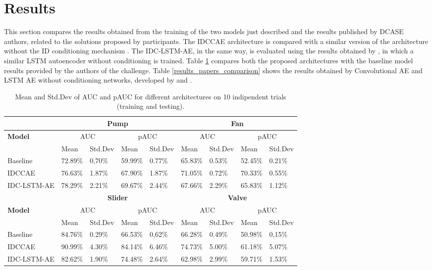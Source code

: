 \section{Results}
This section compares the results obtained from the training of the two models just described and the results published by DCASE authors, related to the solutions proposed by participants. The IDCCAE architecture is compared with a similar version of the architecture without the ID conditioning mechanism \cite{15DeepDenseConvAE}. The IDC-LSTM-AE, in the same way, is evaluated using the results obtained by \cite{16LSTMDeepAutoencodersForASDtask}, in which a similar LSTM autoencoder without conditioning is trained. 
Table \ref{results} compares both the proposed architectures with the baseline model results provided by the authors of the challenge.
Table \ref{results_papers_comparison} shows the results obtained by Convolutional AE and LSTM AE without conditioning networks, developed by \cite{15DeepDenseConvAE} and \cite{16LSTMDeepAutoencodersForASDtask}.

\begin{table}[ht]
\small
\centering
\begin{tabular}{|m{2.8cm}|m{1.2cm}|m{1.3cm}|m{1.2cm}|m{1.3cm}|m{1.2cm}|m{1.3cm}|m{1.2cm}|m{1.3cm}|} 
\cline{2-9}
\multicolumn{1}{c|}{} & \multicolumn{4}{c|}{\textbf{Pump}} & \multicolumn{4}{c|}{\textbf{Fan}} \\ 
\hline
\multirow{2}{*}{\textbf{Model}} & \multicolumn{2}{c|}{AUC} & \multicolumn{2}{c|}{pAUC} & \multicolumn{2}{c|}{AUC} & \multicolumn{2}{c|}{pAUC} \\ 
\cline{2-9}
 & Mean & Std.Dev & Mean & Std.Dev & Mean & Std.Dev & Mean & Std.Dev \\ 
\hline
Baseline & 72.89\% & 0,70\%~ & 59.99\% & 0.77\% & 65.83\% & 0.53\% & 52.45\% & 0.21\% \\ 
\hline
IDCCAE & 76.63\% & 1.87\% & 67.90\% & 1.87\% & 71.05\% & 0.72\% & 70.33\% & 0.55\% \\ 
\hline
IDC-LSTM-AE & 78.29\% & 2.21\% & 69.67\% & 2.44\% & 67.66\% & 2.29\% & 65.83\% & 1.12\% \\ 
\hline
\multicolumn{1}{c|}{} & \multicolumn{4}{c|}{\textbf{Slider}} & \multicolumn{4}{c|}{\textbf{Valve}} \\ 
\hline
\multirow{2}{*}{\textbf{Model}} & \multicolumn{2}{c|}{AUC} & \multicolumn{2}{c|}{pAUC} & \multicolumn{2}{c|}{AUC} & \multicolumn{2}{c|}{pAUC} \\ 
\cline{2-9}
 & Mean & Std.Dev & Mean & Std.Dev & Mean & Std.Dev & Mean & Std.Dev \\ 
\hline
Baseline & 84.76\% & 0.29\% & 66.53\% & 0,62\%~ & 66.28\% & 0.49\% & 50.98\% & 0,15\%~ \\ 
\hline
IDCCAE & 90.99\% & 4.30\% & 84.14\% & 6.46\% & 74.73\% & 5.00\% & 61.18\% & 5.07\% \\ 
\hline
IDC-LSTM-AE & 82.62\% & 1.90\% & 74.48\% & 2.64\% & 62.98\% & 2.99\% & 59.71\% & 1.53\% \\
\hline
\end{tabular}
\caption{Mean and Std.Dev of AUC and pAUC for different architectures on 10 indipendent trials (training and testing).}
\label{results}
\end{table}

